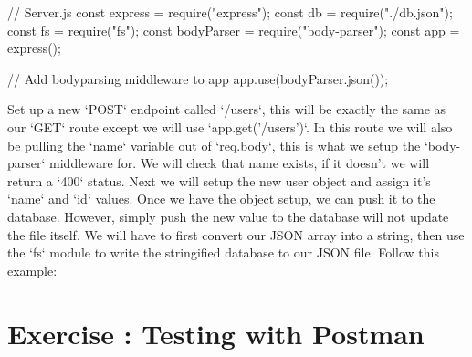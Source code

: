 \documentclass{42-en}
\begin{document}
	\begin{42jscode}
		// Server.js
		const express = require("express");
		const db = require("./db.json");
		const fs = require("fs");
		const bodyParser = require("body-parser");
		const app = express();

		// Add bodyparsing middleware to app
		app.use(bodyParser.json());
	\end{42jscode}


Set up a new `POST` endpoint called `/users`, this will be exactly the same as our `GET` route except we will use `app.get('/users')`. In this route we will also be pulling the `name` variable out of `req.body`, this is what we setup the `body-parser` middleware for. We will check that name exists, if it doesn't we will return a `400` status. Next we will setup the new user object and assign it's `name` and `id` values. Once we have the object setup, we can push it to the database. However, simply push the new value to the database will not update the file itself. We will have to first convert our JSON array into a string, then use the `fs` module to write the stringified database to our JSON file. Follow this example:



\newpage
\nextexercice


\chapter{Exercise \exercicenumber: Testing with Postman}
\end{document}
